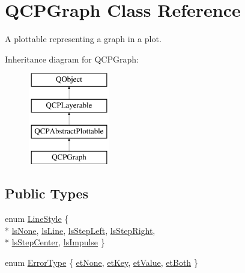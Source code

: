 \hypertarget{classQCPGraph}{\section{Q\-C\-P\-Graph Class Reference}
\label{classQCPGraph}
}


A plottable representing a graph in a plot.  


Inheritance diagram for Q\-C\-P\-Graph\-:\begin{figure}[H]
\begin{center}
\leavevmode
\includegraphics[height=4.000000cm]{classQCPGraph}
\end{center}
\end{figure}
\subsection*{Public Types}
\begin{DoxyCompactItemize}
\item 
enum \hyperlink{classQCPGraph_ad60175cd9b5cac937c5ee685c32c0859}{Line\-Style} \{ \\*
\hyperlink{classQCPGraph_ad60175cd9b5cac937c5ee685c32c0859aea9591b933733cc7b20786b71e60fa04}{ls\-None}, 
\hyperlink{classQCPGraph_ad60175cd9b5cac937c5ee685c32c0859a3c42a27b15aa3c92d399082fad8b7515}{ls\-Line}, 
\hyperlink{classQCPGraph_ad60175cd9b5cac937c5ee685c32c0859ae10568bda57836487d9dec5eba1d6c6e}{ls\-Step\-Left}, 
\hyperlink{classQCPGraph_ad60175cd9b5cac937c5ee685c32c0859a9c37951f7d11aa070100fd16f2935c9e}{ls\-Step\-Right}, 
\\*
\hyperlink{classQCPGraph_ad60175cd9b5cac937c5ee685c32c0859a5adf7b04da215a40a764c21294ea7366}{ls\-Step\-Center}, 
\hyperlink{classQCPGraph_ad60175cd9b5cac937c5ee685c32c0859aa3b358b4ae7cca94aceeb8e529c12ebb}{ls\-Impulse}
 \}
\item 
enum \hyperlink{classQCPGraph_ad23b514404bd2cb3216f57c90904d6af}{Error\-Type} \{ \hyperlink{classQCPGraph_ad23b514404bd2cb3216f57c90904d6afaeae745e7cc1766bb8546e35d4b76a711}{et\-None}, 
\hyperlink{classQCPGraph_ad23b514404bd2cb3216f57c90904d6afa2a5d89cd76fb8b6b18d71b8f6f6c0f43}{et\-Key}, 
\hyperlink{classQCPGraph_ad23b514404bd2cb3216f57c90904d6afa147022ccdc49f6bd48f904cb4f61872e}{et\-Value}, 
\hyperlink{classQCPGraph_ad23b514404bd2cb3216f57c90904d6afa761cb7d61670c1e2efecccd8974409ab}{et\-Both}
 \}
\end{DoxyCompactItemize}

